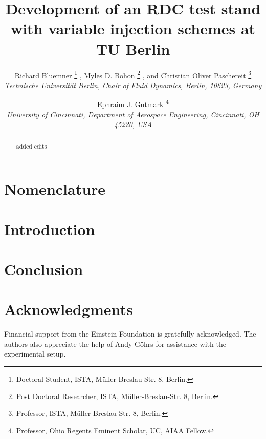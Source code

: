 \documentclass{aiaa-tc}%
\title{Development of an RDC test stand with variable injection schemes at TU Berlin}
\author{
    Richard Bluemner%
  	\thanks{Doctoral Student, ISTA, Müller-Breslau-Str. 8, Berlin.}
  ,	Myles D. Bohon%
  	\thanks{Post Doctoral Researcher, ISTA, Müller-Breslau-Str. 8, Berlin.}
  , and Christian Oliver Paschereit%
  \thanks{Professor, ISTA, Müller-Breslau-Str. 8, Berlin.}\\
  {\normalsize\itshape
   Technische Universität Berlin, Chair of Fluid Dynamics, Berlin, 10623, Germany}
  \and
  Ephraim J. Gutmark%
   \thanks{Professor, Ohio Regents Eminent Scholar, UC, AIAA Fellow.}\\
  {\normalsize\itshape
  University of Cincinnati, Department of Aerospace Engineering, Cincinnati, OH 45220, USA}
 }
\begin{document}
\maketitle

\begin{abstract}

added edits

\end{abstract}

\section*{Nomenclature}


\section{Introduction}


\section{Conclusion}


\section*{Acknowledgments}
Financial support from the Einstein Foundation is gratefully acknowledged. The authors also appreciate the help of Andy Göhrs for assistance with the experimental setup.



\end{document}
